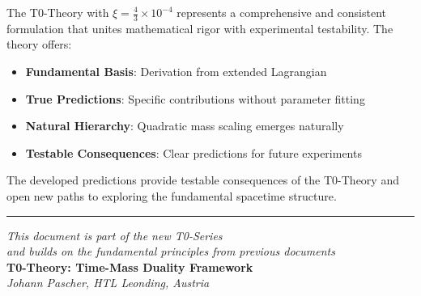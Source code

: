 \documentclass[12pt,a4paper]{article}
\begin{document}
	\begin{keyresult}
		The T0-Theory with $\xi = \frac{4}{3} \times 10^{-4}$ represents a comprehensive and consistent formulation that unites mathematical rigor with experimental testability. The theory offers:
		
		\begin{itemize}
			\item \textbf{Fundamental Basis}: Derivation from extended Lagrangian
			\item \textbf{True Predictions}: Specific contributions without parameter fitting
			\item \textbf{Natural Hierarchy}: Quadratic mass scaling emerges naturally
			\item \textbf{Testable Consequences}: Clear predictions for future experiments
		\end{itemize}
		
		The developed predictions provide testable consequences of the T0-Theory and open new paths to exploring the fundamental spacetime structure.
	\end{keyresult}
	
	\begin{center}
		\hrule
		\vspace{0.5cm}
		\textit{This document is part of the new T0-Series}\\
		\textit{and builds on the fundamental principles from previous documents}\\
		\vspace{0.3cm}
		\textbf{T0-Theory: Time-Mass Duality Framework}\\
		\textit{Johann Pascher, HTL Leonding, Austria}\\
	\end{center}
	
\end{document}
